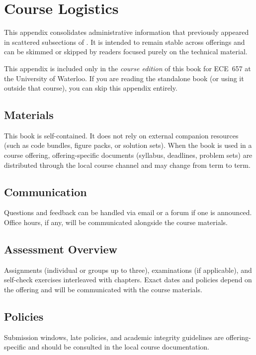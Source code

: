 \section{Course Logistics}\label{app:course_logistics}

This appendix consolidates administrative information that previously appeared in scattered subsections of . It is intended to remain stable across offerings and can be skimmed or skipped by readers focused purely on the technical material.

\begin{tcolorbox}[summarybox, title={Course-only appendix (ECE~657)}]
This appendix is included only in the \emph{course edition} of this book for ECE~657 at the University of Waterloo. If you are reading the standalone book (or using it outside that course), you can skip this appendix entirely.
\end{tcolorbox}

\subsection*{Materials}
This book is self-contained. It does not rely on external companion resources (such as code bundles, figure packs, or solution sets). When the book is used in a course offering, offering-specific documents (syllabus, deadlines, problem sets) are distributed through the local course channel and may change from term to term.

\subsection*{Communication}
Questions and feedback can be handled via email or a forum if one is announced. Office hours, if any, will be communicated alongside the course materials.

\subsection*{Assessment Overview}
Assignments (individual or groups up to three), examinations (if applicable), and self-check exercises interleaved with chapters. Exact dates and policies depend on the offering and will be communicated with the course materials.

\subsection*{Policies}
Submission windows, late policies, and academic integrity guidelines are offering-specific and should be consulted in the local course documentation.

